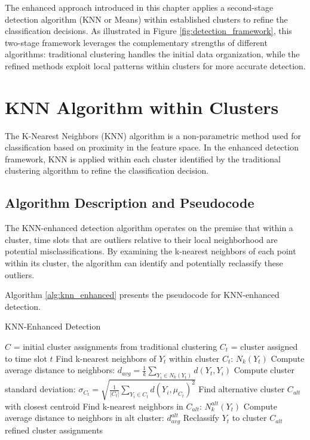 The enhanced approach introduced in this chapter applies a second-stage detection algorithm (KNN or Means) within established clusters to refine the classification decisions. As illustrated in Figure \ref{fig:detection_framework}, this two-stage framework leverages the complementary strengths of different algorithms: traditional clustering handles the initial data organization, while the refined methods exploit local patterns within clusters for more accurate detection.

\section{KNN Algorithm within Clusters}

The K-Nearest Neighbors (KNN) algorithm is a non-parametric method used for classification based on proximity in the feature space. In the enhanced detection framework, KNN is applied within each cluster identified by the traditional clustering algorithm to refine the classification decision.

\subsection{Algorithm Description and Pseudocode}

The KNN-enhanced detection algorithm operates on the premise that within a cluster, time slots that are outliers relative to their local neighborhood are potential misclassifications. By examining the k-nearest neighbors of each point within its cluster, the algorithm can identify and potentially reclassify these outliers.

Algorithm \ref{alg:knn_enhanced} presents the pseudocode for KNN-enhanced detection.

\begin{algorithm}
\caption{KNN-Enhanced Detection}
\label{alg:knn_enhanced}
\begin{algorithmic}[1]
    \State $C$ = initial cluster assignments from traditional clustering
        \State $C_t$ = cluster assigned to time slot $t$
        \State Find k-nearest neighbors of $Y_t$ within cluster $C_t$: $N_k(Y_t)$
        \State Compute average distance to neighbors: $d_{avg} = \frac{1}{k}\sum_{Y_i \in N_k(Y_t)} d(Y_t, Y_i)$
        \State Compute cluster standard deviation: $\sigma_{C_t} = \sqrt{\frac{1}{|C_t|}\sum_{Y_i \in C_t} d(Y_i, \mu_{C_t})^2}$
            \State Find alternative cluster $C_{alt}$ with closest centroid
            \State Find k-nearest neighbors in $C_{alt}$: $N_k^{alt}(Y_t)$
            \State Compute average distance to neighbors in alt cluster: $d_{avg}^{alt}$
                \State Reclassify $Y_t$ to cluster $C_{alt}$
            \EndIf
        \EndIf
    \EndFor
    \State \Return refined cluster assignments
\EndProcedure
\end{algorithmic}
\end{algorithm}

